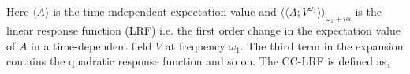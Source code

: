 Here $\langle A \rangle$ is the time independent expectation value and
${\langle\langle A;V^{\omega_1}\rangle\rangle}_{\omega_1 + i\alpha}$
is the linear response function (LRF) i.e. the first order change in the expectation value of 
$A$ in a time-dependent field $V$ at frequency $\omega_1$. The third term in the expansion
contains the quadratic response function and so on. The CC-LRF is defined as,
\\





